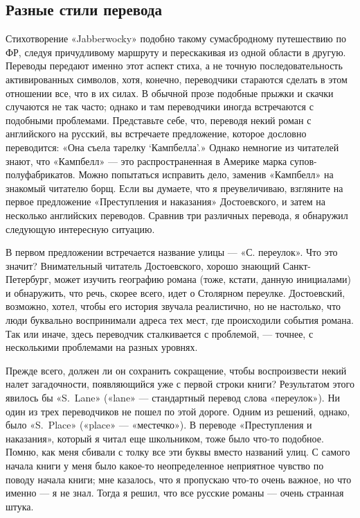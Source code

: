 \documentclass[../main.tex]{subfiles}
\begin{document}
\subsection{Разные стили перевода}

Стихотворение «Jabberwocky» подобно такому сумасбродному путешествию по ФР, следуя причудливому маршруту и перескакивая из одной области в другую. Переводы передают именно этот аспект стиха, а не точную последовательность активированных символов, хотя, конечно, переводчики стараются сделать в этом отношении все, что в их силах. В обычной прозе подобные прыжки и скачки случаются не так часто; однако и там переводчики иногда встречаются с подобными проблемами. Представьте себе, что, переводя некий роман с английского на русский, вы встречаете предложение, которое дословно переводится: «Она съела тарелку \enquote*{Кампбелла}.» Однако немногие из читателей знают, что «Кампбелл» --- это распространенная в Америке марка супов-полуфабрикатов. Можно попытаться исправить дело, заменив «Кампбелл» на знакомый читателю борщ. Если вы думаете, что я преувеличиваю, взгляните на первое предложение «Преступления и наказания» Достоевского, и затем на несколько английских переводов. Сравнив три различных перевода, я обнаружил следующую интересную ситуацию.

В первом предложении встречается название улицы --- «С. переулок». Что это значит? Внимательный читатель Достоевского, хорошо знающий Санкт-Петербург, может изучить географию романа (тоже, кстати, данную инициалами) и обнаружить, что речь, скорее всего, идет о Столярном переулке. Достоевский, возможно, хотел, чтобы его история звучала реалистично, но не настолько, что люди буквально воспринимали адреса тех мест, где происходили события романа. Так или иначе, здесь переводчик сталкивается с проблемой, --- точнее, с несколькими проблемами на разных уровнях.

Прежде всего, должен ли он сохранить сокращение, чтобы воспроизвести некий налет загадочности, появляющийся уже с первой строки книги? Результатом этого явилось бы «S.~Lane» («lane» --- стандартный перевод слова «переулок»). Ни один из трех переводчиков не пошел по этой дороге. Одним из решений, однако, было «S.~Place» («place» --- «местечко»). В переводе «Преступления и наказания», который я читал еще школьником, тоже было что-то подобное. Помню, как меня сбивали с толку все эти буквы вместо названий улиц. С самого начала книги у меня было какое-то неопределенное неприятное чувство по поводу начала книги; мне казалось, что я пропускаю что-то очень важное, но что именно --- я не знал. Тогда я решил, что все русские романы --- очень странная штука.
\end{document}
